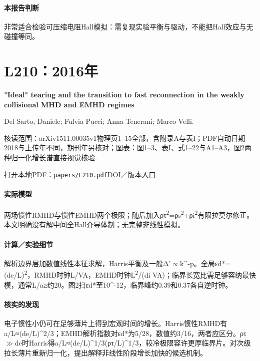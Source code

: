 \paragraph{本报告判断}非常适合检验可压缩电阻Hall模拟：需复现实验平衡与驱动，不能把Hall效应与无碰撞等同。

\section{L210：2016年}\label{paper:L210}

\textbf{"Ideal" tearing and the transition to fast reconnection in the weakly collisional MHD and EMHD regimes}\citep{L210}\

Del Sarto,  Daniele;  Fulvia Pucci;  Anna Tenerani;  Marco Velli.

\textsf{核读范围：}arXiv1511.00035v1物理页1–15全部，含附录A与表I；PDF自动日期2018与上传年不同，期刊年另核对；\textsf{图表：}图1–3、表I、式1–22与A1–A3，图2两种归一化增长谱直接视觉核验.

\href{run:papers/L210.pdf}{打开本地PDF：\texttt{papers/L210.pdf}}\quad\href{https://doi.org/10.1002/2015ja021975}{DOI／版本入口}

\paragraph{实际模型}两场惯性RMHD与惯性EMHD两个极限；随后加入ρτ\textsuperscript{2}=ρs\textsuperscript{2}+ρi\textsuperscript{2}有限拉莫尔修正。本文明确没有解中间全Hall介导体制；无完整非线性模拟。

\paragraph{计算／实验细节}解析边界层加数值线性本征求解，Harris平衡及一般Δ'\ensuremath{\propto}k\textasciicircum{}-p。全局εd*=(de/L)\textsuperscript{2}，RMHD时钟L/VA，EMHD时钟L\textsuperscript{2}/(di VA)；临界长宽比需足够容纳最快模，通常L/a≥约20。图2扫εd*至10\textasciicircum{}-12，临界峰约0.39和0.37各自逆时钟。

\paragraph{核实的发现}电子惯性小仍可在足够薄片上得到宏观时间的增长。Harris惯性RMHD有a/L≈(de/L)\textasciicircum{}2/3；EMHD解析指数对εd*为5/28，数值约3/16，两者应区分。ρτ\ensuremath{\gg}de时Harris得a/L≈(de/L)\textasciicircum{}1/3(ρτ/L)\textasciicircum{}1/3，较冷极限容许更厚临界片。对次级拉长薄片重新归一化，提出解释非线性阶段增长加快的候选机制。

